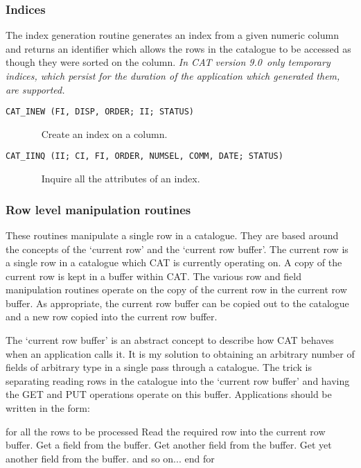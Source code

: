 \documentclass[11pt,twoside]{starlink}
\providecommand{\CATversion}{9.0~}
\begin{document}
\subsubsection{Indices}

The index generation routine generates an index from a given numeric
column and returns an identifier which allows the rows in the catalogue
to be accessed as though they were sorted on the column.   \textit{In CAT
version \CATversion only temporary indices, which persist for the
duration of the application which generated them, are supported.}

\begin{description}

  \item[ \texttt{CAT\_INEW (FI, DISP, ORDER; II; STATUS) } ] ~
  \newline Create an index on a column.

  \item[ \texttt{CAT\_IINQ (II; CI, FI, ORDER, NUMSEL, COMM, DATE; STATUS) } ] ~
  \newline Inquire all the attributes of an index.

\end{description}

\subsubsection{Row level manipulation routines}

These routines manipulate a single row in a catalogue. They are based
around the concepts of the `current row' and the `current row buffer'.
The current row is a single row in a catalogue which CAT is
currently operating on. A copy of the current row is kept in a buffer
within CAT. The various row and field manipulation routines operate
on the copy of the current row in the current row buffer. As
appropriate, the current row buffer can be copied out to the catalogue
and a new row copied into the current row buffer.

The `current row buffer' is an abstract concept to describe how CAT
behaves when an application calls it. It is my solution to obtaining
an arbitrary number of fields of arbitrary type in a single
pass through a catalogue. The trick is separating reading rows in the
catalogue into the `current row buffer' and having the GET and PUT
operations operate on this buffer. Applications should be written in the
form:

\begin{terminalv}
for all the rows to be processed
  Read the required row into the current row buffer.
  Get a field from the buffer.
  Get another field from the buffer.
  Get yet another field from the buffer.
  and so on...
end for
\end{terminalv}
\end{document}
